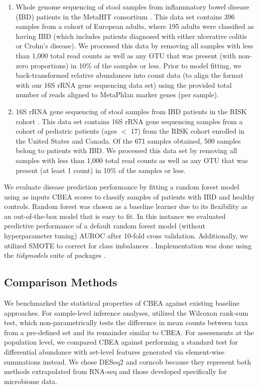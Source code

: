 \documentclass[10pt,letterpaper]{article}
\begin{document}
\begin{enumerate}
\item Whole genome sequencing of stool samples from inflammatory bowel disease (IBD) patients in the MetaHIT consortium \cite{nielsen2014}. This data set contains 396 samples from a cohort of European adults, where 195 adults were classified as having IBD (which includes patients diagnosed with either ulcerative colitis or Crohn's disease). We processed this data by removing all samples with less than 1,000 total read counts as well as any OTU that was present (with non-zero proportions) in 10\% of the samples or less. Prior to model fitting, we back-transformed relative abundances into count data (to align the format with our 16S rRNA gene sequencing data set) using the provided total number of reads aligned to MetaPhlan marker genes (per sample).   

\item 16S rRNA gene sequencing of stool samples from IBD patients in the RISK cohort \cite{gevers2014}. This data set contains 16S rRNA gene sequencing samples from a cohort of pediatric patients (ages $<$ 17) from the RISK cohort enrolled in the United States and Canada. Of the 671 samples obtained, 500 samples belong to patients with IBD. We processed this data set by removing all samples with less than 1,000 total read counts as well as any OTU that was present (at least 1 count) in 10\% of the samples or less.   
\end{enumerate}

We evaluate disease prediction performance by fitting a random forest model \cite{breiman2001} using as inputs CBEA scores to classify samples of patients with IBD and healthy controls. Random forest was chosen as a baseline learner due to its flexibility as an out-of-the-box model that is easy to fit. In this instance we evaluated predictive performance of a default random forest model (without hyperparameter tuning) AUROC after 10-fold cross validation. Additionally, we utilized SMOTE to correct for class imbalances \cite{chawla2002}. Implementation was done using the \emph{tidymodels} suite of packages \cite{kuhn2020}.   

\subsection*{Comparison Methods} 
We benchmarked the statistical properties of CBEA against existing baseline approaches. For sample-level inference analyses, utilized the Wilcoxon rank-sum test, which non-parametrically tests the difference in mean counts between taxa from a pre-defined set and its remainder similar to CBEA. For assessments at the population level, we compared CBEA against performing a standard test for differential abundance with set-level features generated via element-wise summations instead. We chose DESeq2 \cite{love2014} and corncob \cite{martin2020} because they represent both methods extrapolated from RNA-seq \cite{mcmurdie2014} and those developed specifically for microbiome data.   
\end{document}
